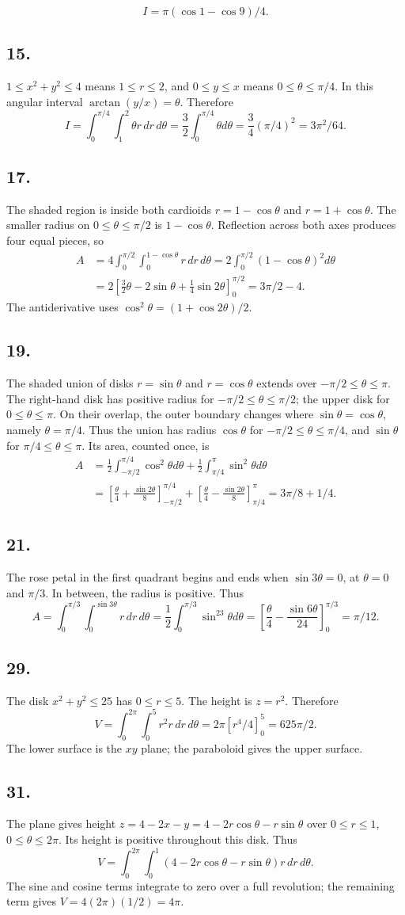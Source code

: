 \documentclass[11pt]{article}
\newcommand{\ex}[1]{\subsection*{#1.}}
\newcommand{\ans}[1]{\boxed{#1}}
\begin{document}
\[\ans{I=\pi(\cos1-\cos9)/4}.\]
\ex{15}
$1\le x^2+y^2\le4$ means $1\le r\le2$, and $0\le y\le x$ means $0\le\theta\le\pi/4$. In this angular interval $\arctan(y/x)=\theta$. Therefore
\[I=\int_0^{\pi/4}\int_1^2\theta r\,dr\,d\theta
=\frac32\int_0^{\pi/4}\theta d\theta=\frac34(\pi/4)^2=\ans{3\pi^2/64}.\]
\ex{17}
The shaded region is inside both cardioids $r=1-\cos\theta$ and $r=1+\cos\theta$. The smaller radius on $0\le\theta\le\pi/2$ is $1-\cos\theta$. Reflection across both axes produces four equal pieces, so
\begin{align*}
A&=4\int_0^{\pi/2}\int_0^{1-\cos\theta}r\,dr\,d\theta
=2\int_0^{\pi/2}(1-\cos\theta)^2d\theta\\
&=2\left[\frac32\theta-2\sin\theta+\frac14\sin2\theta\right]_0^{\pi/2}
=\ans{3\pi/2-4}.
\end{align*}
The antiderivative uses $\cos^2\theta=(1+\cos2\theta)/2$.
\ex{19}
The shaded union of disks $r=\sin\theta$ and $r=\cos\theta$ extends over $-\pi/2\le\theta\le\pi$. The right-hand disk has positive radius for $-\pi/2\le\theta\le\pi/2$; the upper disk for $0\le\theta\le\pi$. On their overlap, the outer boundary changes where $\sin\theta=\cos\theta$, namely $\theta=\pi/4$. Thus the union has radius $\cos\theta$ for $-\pi/2\le\theta\le\pi/4$, and $\sin\theta$ for $\pi/4\le\theta\le\pi$. Its area, counted once, is
\begin{align*}
A&=\frac12\int_{-\pi/2}^{\pi/4}\cos^2\theta d\theta+\frac12\int_{\pi/4}^\pi\sin^2\theta d\theta\\
&=\left[\frac\theta4+\frac{\sin2\theta}{8}\right]_{-\pi/2}^{\pi/4}
+\left[\frac\theta4-\frac{\sin2\theta}{8}\right]_{\pi/4}^\pi
=\ans{3\pi/8+1/4}.
\end{align*}
\ex{21}
The rose petal in the first quadrant begins and ends when $\sin3\theta=0$, at $\theta=0$ and $\pi/3$. In between, the radius is positive. Thus
\[A=\int_0^{\pi/3}\int_0^{\sin3\theta}r\,dr\,d\theta
=\frac12\int_0^{\pi/3}\sin^23\theta d\theta
=\left[\frac\theta4-\frac{\sin6\theta}{24}\right]_0^{\pi/3}=\ans{\pi/12}.\]
\ex{29}
The disk $x^2+y^2\le25$ has $0\le r\le5$. The height is $z=r^2$. Therefore
\[V=\int_0^{2\pi}\int_0^5r^2r\,dr\,d\theta
=2\pi[r^4/4]_0^5=\ans{625\pi/2}.\]
The lower surface is the $xy$ plane; the paraboloid gives the upper surface.
\ex{31}
The plane gives height $z=4-2x-y=4-2r\cos\theta-r\sin\theta$ over $0\le r\le1$, $0\le\theta\le2\pi$. Its height is positive throughout this disk. Thus
\[V=\int_0^{2\pi}\int_0^1(4-2r\cos\theta-r\sin\theta)r\,dr\,d\theta.
\]
The sine and cosine terms integrate to zero over a full revolution; the remaining term gives $V=4(2\pi)(1/2)=\ans{4\pi}$.
\end{document}
